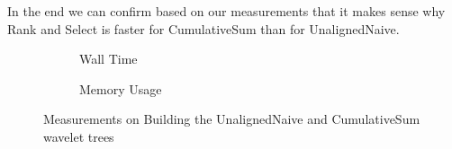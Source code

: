 In the end we can confirm based on our measurements that it makes sense why Rank and Select is faster for CumulativeSum than for UnalignedNaive.







\begin{figure}\tiny
\begin{subfigure}{0.48\textwidth}
	
	\caption{Wall Time}
	\label{fig:CumulativeSumBuildWalltime}
\end{subfigure}
\hfill
\begin{subfigure}{0.48\textwidth}
	
	\caption{Memory Usage}
	\label{fig:CumulativeSumBuildMemoryUsage}
\end{subfigure}
\caption{Measurements on Building the UnalignedNaive and CumulativeSum wavelet trees}
\label{fig:CumulativeSumBuild}
\end{figure}



